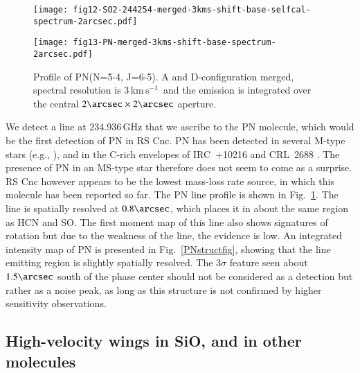 \documentclass{aa}
\newcommand{\kms}{\,km\,s$^{-1}$~}
\begin{document}
\begin{figure}[h]
  \begin{minipage}[b]{0.45\linewidth}
  \centering
  \vspace{-3.0cm}
  \texttt{[image: fig12-SO2-244254-merged-3kms-shift-base-selfcal-spectrum-2arcsec.pdf]}
  \caption{Profile of SO$_2$ (14(0,14)-13(1,13)). A and D-configuration merged,
           spectral resolution is 3\kms and the emission is integrated 
           over the central $2\arcsec \times 2\arcsec$ aperture.}
  \label{so2244fig}
  \end{minipage}
  \hspace{0.25cm}
  \begin{minipage}[b]{0.45\linewidth}
  \centering
  \vspace{-3.0cm}
  \texttt{[image: fig13-PN-merged-3kms-shift-base-spectrum-2arcsec.pdf]}
  \caption{Profile of PN(N=5-4, J=6-5). A and D-configuration merged, 
           spectral resolution is 3\kms and the emission is integrated 
           over the central $2\arcsec \times 2\arcsec$ aperture.}
  \label{pnlinefig}
  \end{minipage}
\end{figure}

We detect a line at 234.936\,GHz that we ascribe to the PN molecule,
which would be the first detection of PN in RS Cnc. PN has been
detected in several M-type stars (e.g.,
\citet{debecketal2013,zsb2018}), and in the C-rich envelopes of
IRC~+10216 and CRL~2688
\citep{guelinetal2000,cernicharoetal2000,milametal2008}. The presence
of PN in an MS-type star therefore does not seem to come as a
surprise. RS Cnc however appears to be the lowest mass-loss rate
source, in which this molecule has been reported so far.  The PN line
profile is shown in Fig.~\ref{pnlinefig}. The line is spatially
resolved at $0.8\arcsec$, which places it in about the same region as
HCN and SO. The first moment map of this line also shows signatures of
rotation but due to the weakness of the line, the evidence is low.  An
integrated intensity map of PN is presented in Fig.~\ref{PNstructfig},
showing that the line emitting region is slightly spatially resolved.
The $3\sigma$ feature seen about $1.5\arcsec$ south of the phase
center should not be considered as a detection but rather as a noise
peak, as long as this structure is not confirmed by higher sensitivity
observations.

\subsection{High-velocity wings in SiO, and in other molecules}
\label{siowingsec}
\end{document}
